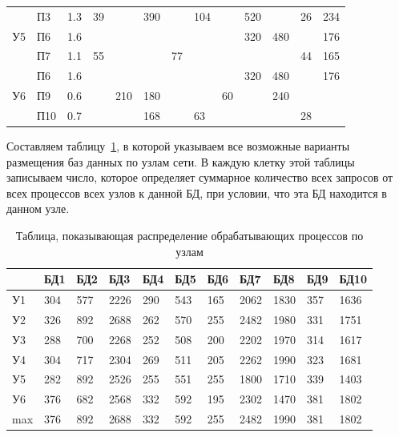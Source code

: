 \documentclass[russian,utf8,emptystyle]{eskdtext}
\begin{document}
\begin{longtable}{p{0.6cm}|p{1cm}|p{1cm}|p{1cm}|p{1cm}|p{1cm}|p{1cm}|p{1cm}|p{1cm}|p{1cm}|p{1cm}|p{1cm}|p{1cm}}
\hline
\multirow{3}{*}{У5}&  П3         & 1.3   & 39  &      & 390  &      & 104  &      & 520  &      & 26   & 234   \\
                   &  П6         & 1.6   &     &      &      &      &      &      & 320  & 480  &      & 176   \\
                   &  П7         & 1.1   & 55  &      &      & 77   &      &      &      &      & 44   & 165   \\
\hline
\multirow{3}{*}{У6}&  П6         & 1.6   &     &      &      &      &      &      & 320  & 480  &      & 176   \\
                   &  П9         & 0.6   &     & 210  & 180  &      &      & 60   &      & 240  &      &       \\
                   &  П10        & 0.7   &     &      & 168  &      & 63   &      &      &      & 28   &       \\
\end{longtable}

Составляем таблицу~\ref{tab:bd-4}, в которой указываем все возможные варианты размещения баз данных по узлам сети. В каждую клетку этой таблицы записываем число, которое определяет суммарное количество всех запросов от всех процессов всех узлов к данной БД, при условии, что эта БД находится в данном узле.

\begin{longtable}{p{1cm}|p{1cm}|p{1cm}|p{1cm}|p{1cm}|p{1cm}|p{1cm}|p{1cm}|p{1cm}|p{1cm}|p{1cm}}
\caption{Таблица, показывающая распределение обрабатывающих процессов по узлам}
\label{tab:bd-4} \\
       &  БД1 &  БД2 &  БД3 &  БД4 &  БД5 &  БД6 &  БД7 &  БД8 &  БД9 &  БД10 \\
\hline
У1     & 304  & 577  & 2226 & 290  & 543  & 165  & 2062 & 1830 & 357  & 1636  \\
\hline
У2     & 326  & 892  & 2688 & 262  & 570  & 255  & 2482 & 1980 & 331  & 1751  \\
\hline
У3     & 288  & 700  & 2268 & 252  & 508  & 200  & 2202 & 1970 & 314  & 1617  \\
\hline
У4     & 304  & 717  & 2304 & 269  & 511  & 205  & 2262 & 1990 & 323  & 1681  \\
\hline
У5     & 282  & 892  & 2526 & 255  & 551  & 255  & 1800 & 1710 & 339  & 1403  \\
\hline
У6     & 376  & 682  & 2568 & 332  & 592  & 195  & 2302 & 1470 & 381  & 1802  \\
\hline\hline
max    & 376  & 892  & 2688 & 332  & 592  & 255  & 2482 & 1990 & 381  & 1802  \\
\end{longtable}
\end{document}
